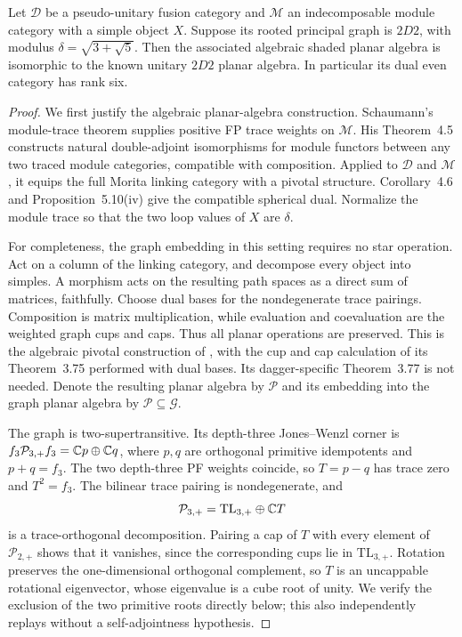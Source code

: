 \begin{lemma}\label{lem:algebraic-2d2}
Let $\mathcal D$ be a pseudo-unitary fusion category and
$\mathcal M$ an indecomposable module category with a simple object
$X$. Suppose its rooted principal graph is $2D2$, with modulus
$\delta=\sqrt{3+\sqrt5}$. Then the associated algebraic shaded
planar algebra is isomorphic to the known unitary $2D2$ planar
algebra. In particular its dual even category has rank six.
\end{lemma}
\begin{proof}
We first justify the algebraic planar-algebra construction.
Schaumann's module-trace theorem
\cite[Proposition~5.8]{SchaumannTraces} supplies positive FP trace
weights on $\mathcal M$. His Theorem~4.5 constructs natural
double-adjoint isomorphisms for module functors between any two
traced module categories, compatible with composition. Applied to
$\mathcal D$ and $\mathcal M$, it equips the full Morita linking
category with a pivotal structure. Corollary~4.6 and
Proposition~5.10(iv) give the compatible spherical dual. Normalize
the module trace so that the two loop values of $X$ are $\delta$.

For completeness, the graph embedding in this setting requires no
star operation. Act on a column of the linking category, and
decompose every object into simples. A morphism acts on the
resulting path spaces as a direct sum of matrices, faithfully.
Choose dual bases for the nondegenerate trace pairings. Composition
is matrix multiplication, while evaluation and coevaluation are
the weighted graph cups and caps. Thus all planar operations are
preserved. This is the algebraic pivotal construction of
\cite[Theorems~3.45 and~3.70]{EH}, with the cup and cap calculation
of its Theorem~3.75 performed with dual bases. Its dagger-specific
Theorem~3.77 is not needed. Denote the resulting planar algebra by
$\mathcal P$ and its embedding into the graph planar algebra by
$\mathcal P\subseteq\mathcal G$.

The graph is two-supertransitive. Its depth-three Jones--Wenzl
corner is $f_3\mathcal P_{3,+}f_3=\mathbb C p\oplus\mathbb C q$, where
$p,q$ are orthogonal primitive idempotents and $p+q=f_3$. The two
depth-three PF weights coincide, so $T=p-q$ has trace zero and
$T^2=f_3$. The bilinear trace pairing is nondegenerate, and
\[
\mathcal P_{3,+}=\mathrm{TL}_{3,+}\oplus\mathbb C T
\]
is a trace-orthogonal decomposition. Pairing a cap of $T$ with
every element of $\mathcal P_{2,+}$ shows that it vanishes, since
the corresponding cups lie in $\mathrm{TL}_{3,+}$. Rotation
preserves the one-dimensional orthogonal complement, so $T$ is
an uncappable rotational eigenvector, whose eigenvalue is a cube
root of unity. We verify the exclusion of the two primitive
roots directly below; this also independently replays
\cite[Lemma~3.2]{MorrisonPenneys2D2} without a self-adjointness
hypothesis.


\end{proof}
